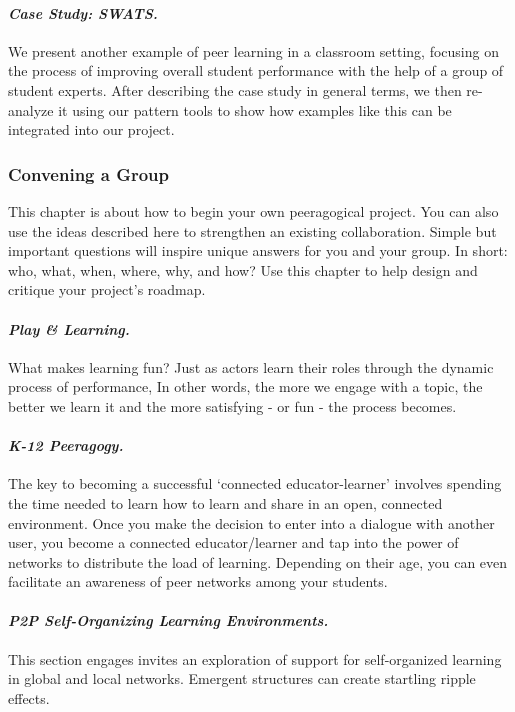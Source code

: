 \paragraph{\emph{Case Study: SWATS.}}
We present another example of peer learning in a classroom setting,
focusing on the process of improving overall student performance with
the help of a group of student experts.  After describing the case
study in general terms, we then re-analyze it using our pattern tools
to show how examples like this can be integrated into our project.

\subsubsection{Convening a Group}

\noindent This chapter is about how to begin your own peeragogical project.
You can also use the ideas described here to strengthen an existing
collaboration.  Simple but important questions will inspire unique
answers for you and your group.  In short: who, what, when, where,
why, and how?  Use this chapter to help design and critique your
project's roadmap.

 \paragraph{\emph{Play \& Learning.}} What
makes learning fun? Just as actors learn their roles through the dynamic
process of performance, In other words, the more we engage with a topic,
the better we learn it and the more satisfying - or fun - the process
becomes.

\paragraph{\emph{K-12 Peeragogy.}} The key to becoming a successful
`connected educator-learner' involves spending the time needed to learn
how to learn and share in an open, connected environment. Once you make
the decision to enter into a dialogue with another user, you become a
connected educator/learner and tap into the power of networks to
distribute the load of learning. Depending on their age, you can even
facilitate an awareness of peer networks among your students.

\paragraph{\emph{P2P Self-Organizing Learning Environments.}} This
section engages invites an exploration of support for self-organized
learning in global and local networks.  Emergent structures
can create startling ripple effects.

